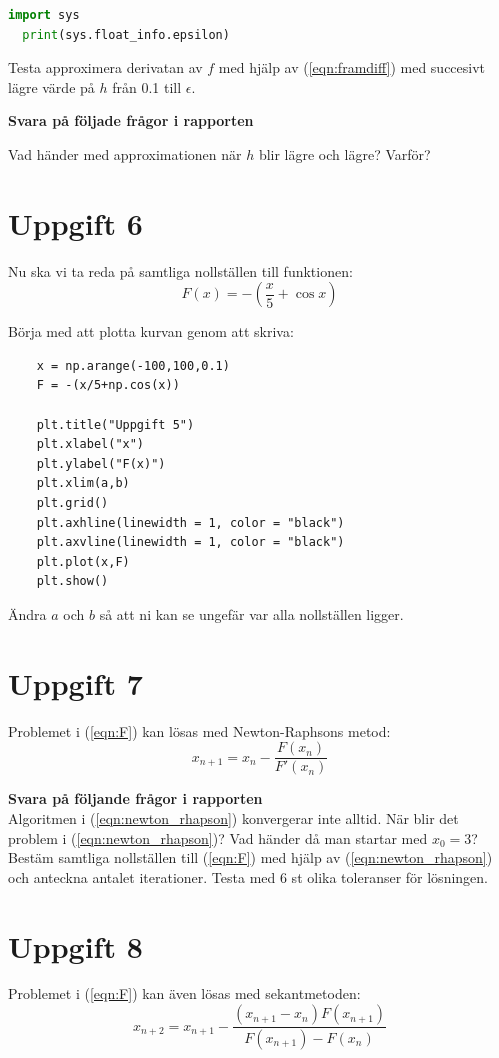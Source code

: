 \documentclass[a4paper]{article}
\begin{document}
\begin{lstlisting}[language=Python]
  import sys
  print(sys.float_info.epsilon)
\end{lstlisting}

Testa approximera derivatan av \(f\) med hjälp av (\ref{eqn:framdiff}) med succesivt lägre värde på \(h\) från 0.1 
till \(\epsilon\). 

\textbf{Svara på följade frågor i rapporten}

Vad händer med approximationen när \(h\) blir lägre och lägre? Varför?


\newpage
\section{Uppgift 6}
Nu ska vi ta reda på samtliga nollställen till funktionen:
\begin{equation} \label{eqn:F}
  F(x)=-\left(\frac{x}{5}+\cos x\right)
\end{equation}

Börja med att plotta kurvan genom att skriva:
\begin{lstlisting}
    x = np.arange(-100,100,0.1)
    F = -(x/5+np.cos(x))

    plt.title("Uppgift 5") 
    plt.xlabel("x") 
    plt.ylabel("F(x)") 
    plt.xlim(a,b) 
    plt.grid()
    plt.axhline(linewidth = 1, color = "black")
    plt.axvline(linewidth = 1, color = "black")
    plt.plot(x,F)
    plt.show()
\end{lstlisting}
Ändra \( a  \) och \( b  \) så att ni kan se ungefär var alla nollställen ligger.


\section{Uppgift 7}
Problemet i (\ref{eqn:F}) kan lösas med Newton-Raphsons metod:
\begin{equation} \label{eqn:newton_rhapson}
  x_{n+1}=x_n-\frac{F(x_n)}{F'(x_n)}
\end{equation}


\textbf{Svara på följande frågor i rapporten}\\
Algoritmen i (\ref{eqn:newton_rhapson}) konvergerar inte alltid. När blir det problem i (\ref{eqn:newton_rhapson})?
Vad händer då man startar med \( x_0 = 3  \)? Bestäm samtliga nollställen
till (\ref{eqn:F}) med hjälp av (\ref{eqn:newton_rhapson}) och anteckna antalet
iterationer. Testa med 6 st olika toleranser för lösningen.


\section{Uppgift 8}
Problemet i (\ref{eqn:F}) kan även lösas med sekantmetoden:
\begin{equation} \label{eqn:sekantmetoden}
  x_{n+2}=x_{n+1}-\frac{(x_{n+1}-x_n)F(x_{n+1})}{F(x_{n+1})-F(x_n)}
\end{equation}
\end{document}
